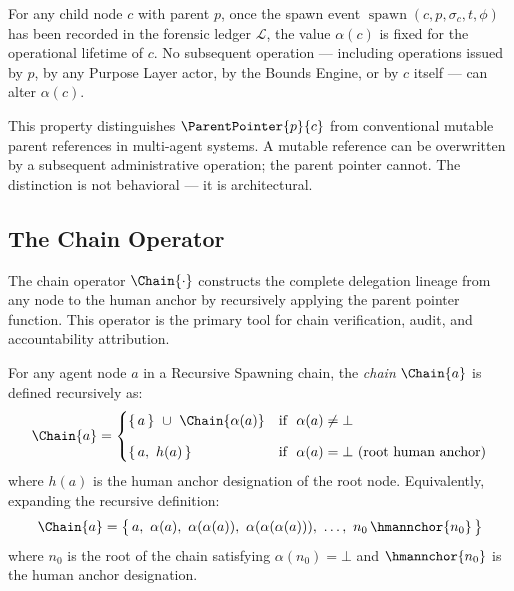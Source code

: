 \begin{prop}
\label{prop:parent-pointer-immutable}
For any child node $c$ with parent $p$, once the spawn event $\operatorname{spawn}(c, p, \sigma_c, t, \phi)$ has been recorded in the forensic ledger $\mathcal{L}$, the value $\alpha(c)$ is fixed for the operational lifetime of $c$. No subsequent operation --- including operations issued by $p$, by any Purpose Layer actor, by the Bounds Engine, or by $c$ itself --- can alter $\alpha(c)$.
\end{prop}

This property distinguishes $\ParentPointer{p}{c}$ from conventional mutable parent references in multi-agent systems. A mutable reference can be overwritten by a subsequent administrative operation; the parent pointer cannot. The distinction is not behavioral --- it is architectural.

\subsection{The Chain Operator}
\label{sec:chain-operator}

The chain operator $\Chain{\cdot}$ constructs the complete delegation lineage from any node to the human anchor by recursively applying the parent pointer function. This operator is the primary tool for chain verification, audit, and accountability attribution.

\begin{dfn}
\label{def:chain-operator}
For any agent node $a$ in a Recursive Spawning chain, the \emph{chain} $\Chain{a}$ is defined recursively as:
\begin{equation}
\Chain{a} =
\begin{cases}
\{\, a \,\}\ \cup\ \Chain{\alpha(a)} & \text{if }\ \alpha(a) \neq \bot \\[8pt]
\{\, a,\ h(a) \,\} & \text{if }\ \alpha(a) = \bot\ \text{(root human anchor)}
\end{cases}
\label{eq:chain-operator}
\end{equation}
where $h(a)$ is the human anchor designation of the root node. Equivalently, expanding the recursive definition:
\begin{equation}
\Chain{a} = \bigl\{\, a,\ \alpha(a),\ \alpha(\alpha(a)),\ \alpha(\alpha(\alpha(a))),\ \ldots,\ n_0 \,\hmannchor{n_0}\, \bigr\}
\label{eq:chain-expanded}
\end{equation}
where $n_0$ is the root of the chain satisfying $\alpha(n_0) = \bot$ and $\hmannchor{n_0}$ is the human anchor designation.
\end{dfn}

